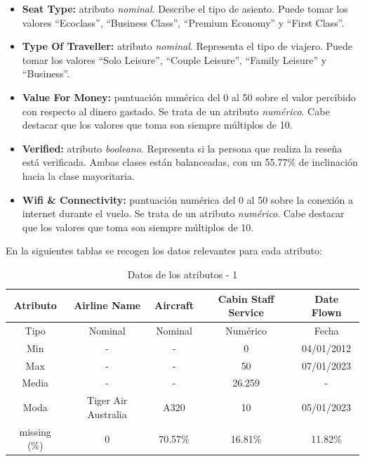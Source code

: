 \documentclass[es]{uc3mreport}
\begin{document}
\begin{report}
\begin{itemize}
    \item \textbf{Seat Type:} atributo \textit{nominal}. Describe el tipo de asiento. Puede tomar los valores ``Ecoclass'',  ``Business Class'', ``Premium Economy'' y ``First Class''.
    \item \textbf{Type Of Traveller:} atributo \textit{nominal}. Representa el tipo de viajero. Puede tomar los valores ``Solo Leisure'', ``Couple Leisure'', ``Family Leisure'' y ``Business''.
    \item \textbf{Value For Money:} puntuación numérica del 0 al 50 sobre el valor percibido con respecto al dinero gastado. Se trata de un atributo \textit{numérico}. Cabe destacar que los valores que toma son siempre múltiplos de 10.
    \item \textbf{Verified:} atributo \textit{booleano}. Representa si la persona que realiza la reseña está verificada. Ambas clases están balanceadas, con un 55.77\% de inclinación hacia la clase mayoritaria.
    \item \textbf{Wifi \& Connectivity:} puntuación numérica del 0 al 50 sobre la conexión a internet durante el vuelo. Se trata de un atributo \textit{numérico}. Cabe destacar que los valores que toma son siempre múltiplos de 10.
\end{itemize}
En la siguientes tablas se recogen los datos relevantes para cada atributo:
\begin{table}[H]
    \center
    \begin{tabular}{@{}ccccc@{}}
        \toprule
        Atributo & Airline Name       & Aircraft & Cabin Staff Service & Date Flown \\
        \midrule
        Tipo     & Nominal            & Nominal  & Numérico            & Fecha      \\
        Min      & -                  & -        & 0                   & 04/01/2012 \\
        Max      & -                  & -        & 50                  & 07/01/2023 \\
        Media    & -                  & -        & 26.259              & -          \\
        Moda     & Tiger Air Australia& A320     & 10                  & 05/01/2023 \\
        missing (\%) & 0              & 70.57\%  & 16.81\%             & 11.82\%    \\
        \bottomrule
    \end{tabular}
    \caption{Datos de los atributos - 1}
\end{table}


\end{report}
\end{document}
